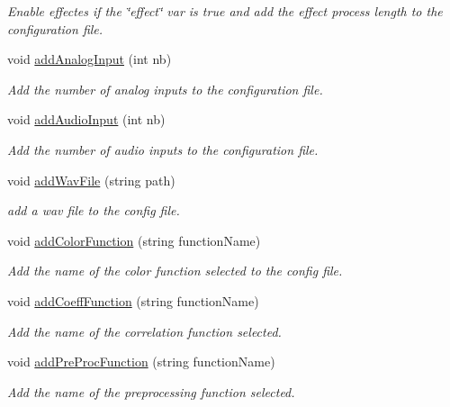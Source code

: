 \begin{DoxyCompactItemize}
\begin{DoxyCompactList}\small\item\em Enable effectes if the \char`\"{}effect\char`\"{} var is true and add the effect process length to the configuration file. \end{DoxyCompactList}\item 
void \mbox{\hyperlink{class_g_u_i_config_file_setting_builder_ae59473c0fb774b24b6a96a1b6e371dd1}{add\+Analog\+Input}} (int nb)
\begin{DoxyCompactList}\small\item\em Add the number of analog inputs to the configuration file. \end{DoxyCompactList}\item 
void \mbox{\hyperlink{class_g_u_i_config_file_setting_builder_adedbf3183bfae8c718f22ea704ac3074}{add\+Audio\+Input}} (int nb)
\begin{DoxyCompactList}\small\item\em Add the number of audio inputs to the configuration file. \end{DoxyCompactList}\item 
void \mbox{\hyperlink{class_g_u_i_config_file_setting_builder_a70e28ae5643efaec463e58b9bfc0d440}{add\+Wav\+File}} (string path)
\begin{DoxyCompactList}\small\item\em add a wav file to the config file. \end{DoxyCompactList}\item 
void \mbox{\hyperlink{class_g_u_i_config_file_setting_builder_a5275c0c1258a3088674bc1ef009e1ea3}{add\+Color\+Function}} (string function\+Name)
\begin{DoxyCompactList}\small\item\em Add the name of the color function selected to the config file. \end{DoxyCompactList}\item 
void \mbox{\hyperlink{class_g_u_i_config_file_setting_builder_a66c807146e8d76be96b8ad2c5088779f}{add\+Coeff\+Function}} (string function\+Name)
\begin{DoxyCompactList}\small\item\em Add the name of the correlation function selected. \end{DoxyCompactList}\item 
void \mbox{\hyperlink{class_g_u_i_config_file_setting_builder_afc97c2bd21304022f9a658325b58bf27}{add\+Pre\+Proc\+Function}} (string function\+Name)
\begin{DoxyCompactList}\small\item\em Add the name of the preprocessing function selected. \end{DoxyCompactList}\item 

\end{DoxyCompactItemize}
